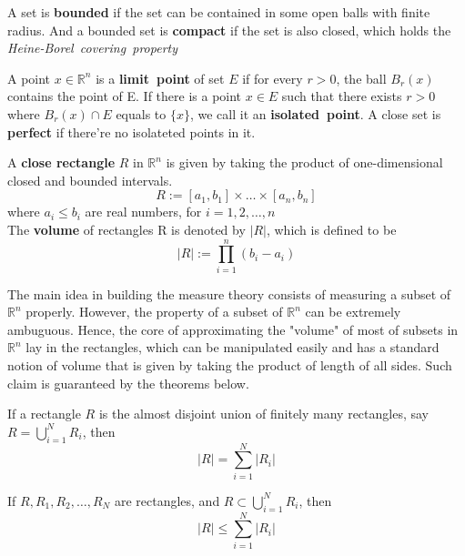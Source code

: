 \documentclass{ctexbook}
\begin{document}
\begin{define}
    A set is \textbf{bounded} if the set can be contained in some open balls with finite radius.
    And a bounded set is \textbf{compact} if the set is also closed, which holds the \textit{Heine-Borel~covering~property} 
\end{define}
\begin{define}
    A point $x\in \mathbb{R}^n$ is a \textbf{limit~point} of set $E$ if for every $r>0$, the ball $B_r(x)$ contains the point of
    E.
    If there is a point $x \in E$ such that there exists $r>0$ where $B_r(x)\cap E$ equals to $\{x\}$, we call it an \textbf{isolated~point}.
    A close set is \textbf{perfect} if there're no isolateted points in it.  
\end{define}
\begin{define}[rectangles]
    A \textbf{close rectangle} $R$ in $\mathbb{R}^n$ is given by taking the product of one-dimensional closed and bounded intervals.
    \[R:=[a_1,b_1]\times\ldots\times[a_n,b_n]\]
    where $a_i\leq b_i$ are real numbers, for $i=1,2,\ldots,n$\\
    The \textbf{volume} of rectangles R is denoted by $\left|R\right|$, which is defined to be 
    \[\left|R\right|:=\prod\limits_{i=1}^n(b_i-a_i)\]
\end{define}

The main idea in building the measure theory consists of measuring a subset of $\mathbb{R}^n$ properly. However, the property of
a subset of $\mathbb{R}^n$ can be extremely ambuguous. Hence, the core of approximating the "volume" of most of subsets in $\mathbb{R}^n$
lay in the rectangles, which can be manipulated easily and has a standard notion of volume that is given by taking the product of
length of all sides. Such claim is guaranteed by the theorems below.

\begin{lema}
    If a rectangle $R$ is the almost disjoint union of finitely many rectangles, say $R = \bigcup \limits_{i=1}^N R_i$, then
    \[\left|R\right|=\sum\limits_{i=1}^N \left|R_i\right|\]
\end{lema}
\begin{lema}
    If $R,R_1,R_2,\ldots,R_N$ are rectangles, and $R \subset \bigcup \limits_{i=1}^N R_i$, then
    \[\left|R\right|\leq\sum\limits_{i=1}^N \left|R_i\right|\]
\end{lema}
\end{document}
